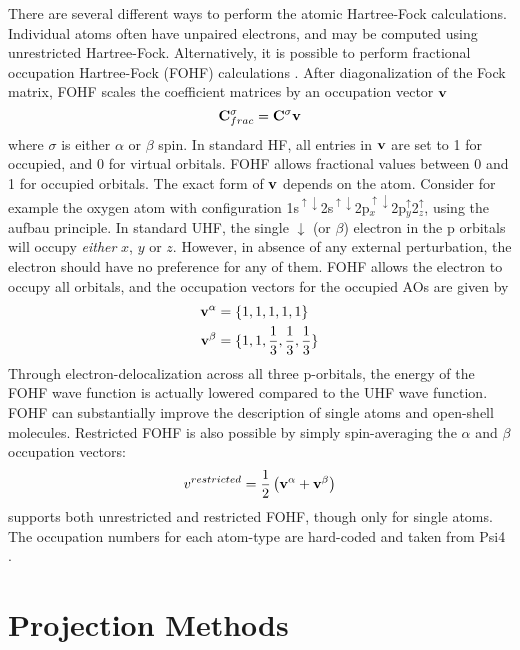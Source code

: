 There are several different ways to perform the atomic Hartree-Fock calculations. Individual atoms often have  unpaired electrons, and may be computed using unrestricted Hartree-Fock. Alternatively, it is possible to perform fractional occupation Hartree-Fock (FOHF) calculations \cite{Bra1980}. After diagonalization of the Fock matrix, FOHF scales the coefficient matrices by an occupation vector $\mathbf{v}$
\begin{equation}
\mathbf{C}^{\sigma}_{frac} = \mathbf{C}^{\sigma} \mathbf{v}
\end{equation} 
\noindent where $\sigma$ is either $\alpha$ or $\beta$ spin. In standard HF, all entries in $\mathbf{v}$ are set to 1 for occupied, and 0 for virtual orbitals. FOHF allows fractional values between 0 and 1 for occupied orbitals. The exact form of $\mathbf{v}$ depends on the atom. Consider for example the oxygen atom with configuration 1s$^{\uparrow\downarrow}$2s$^{\uparrow\downarrow}$2p$_x^{\uparrow\downarrow}$2p$_y^{\uparrow}$2$_z^{\uparrow}$, using the aufbau principle. In standard UHF, the single $\downarrow$ (or $\beta$) electron in the p orbitals will occupy \emph{either} $x$, $y$ or $z$. However, in absence of any external perturbation, the electron should have no preference for any of them. FOHF allows the electron to occupy all orbitals, and the occupation vectors for the occupied AOs are given by
\begin{align}
\mathbf{v}^{\alpha} &= \{1,1,1,1,1\} \\
\mathbf{v}^{\beta} &= \{1,1,\frac{1}{3},\frac{1}{3},\frac{1}{3}\}
\end{align}
\noindent Through electron-delocalization across all three p-orbitals, the energy of the FOHF wave function is actually lowered compared to the UHF wave function. FOHF can substantially improve the description of single atoms and open-shell molecules. Restricted FOHF is also possible by simply spin-averaging the $\alpha$ and $\beta$ occupation vectors:
\begin{equation}
v^{restricted} = \frac{1}{2} \left( \mathbf{v}^{\alpha} + \mathbf{v}^{\beta} \right)
\end{equation}
\noindent \mchem{} supports both unrestricted and restricted FOHF, though only for single atoms. The occupation numbers for each atom-type are hard-coded and taken from Psi4 \cite{Tur2012}.

\section{Projection Methods}

